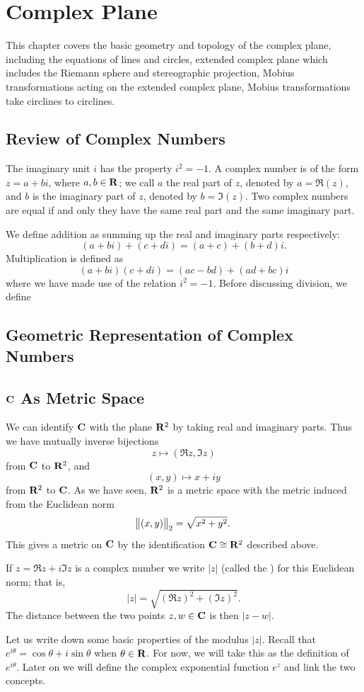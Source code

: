 \chapter{Complex Plane}
This chapter covers the basic geometry and topology of the complex plane, including the equations of lines and circles, extended complex plane which includes the Riemann sphere and stereographic projection, Mobius transformations acting on the extended complex plane, Mobius transformations take circlines to circlines.

\section{Review of Complex Numbers}
The imaginary unit $i$ has the property $i^2=-1$. A complex number is of the form $z=a+bi$, where $a,b\in\mathbf R$; we call $a$ the real part of $z$, denoted by $a=\Re(z)$, and $b$ is the imaginary part of $z$, denoted by $b=\Im(z)$. Two complex numbers are equal if and only they have the same real part and the same imaginary part.

We define addition as summing up the real and imaginary parts respectively:
\[(a+bi)+(c+di)=(a+c)+(b+d)i.\]
Multiplication is defined as
\[(a+bi)(c+di)=(ac-bd)+(ad+bc)i\]
where we have made use of the relation $i^2=-1$. Before discussing division, we define 

\section{Geometric Representation of Complex Numbers}

\section{$\mathbf C$ As Metric Space}
We can identify $\mathbf C$ with the plane $\mathbf R^2$ by taking
real and imaginary parts. Thus we have mutually inverse bijections
\[z\mapsto(\Re z,\Im z)\]
from $\mathbf C$ to $\mathbf R^2$, and
\[(x,y)\mapsto x+iy\]
from $\mathbf R^2$ to $\mathbf C$. As we have seen, $\mathbf R^2$ is a metric space with the metric induced from the Euclidean norm
\[\norm{(x,y)}_2=\sqrt{x^2+y^2}.\]
This gives a metric on $\mathbf C$ by the identification $\mathbf C\cong\mathbf R^2$ described above.

If $z=\Re z+i\Im z$ is a complex number we write $|z|$ (called the ) for this Euclidean norm; that is,
\[|z|=\sqrt{(\Re z)^2+(\Im z)^2}.\]
The distance between the two points $z,w\in\mathbf C$ is then $|z-w|$.

Let us write down some basic properties of the modulus $|z|$. Recall that $e^{i\theta}=\cos\theta+i\sin\theta$ when $\theta\in\mathbf R$. For now, we will take this as the definition of $e^{i\theta}$. Later on we will define the complex exponential function $e^z$ and link the two concepts.

